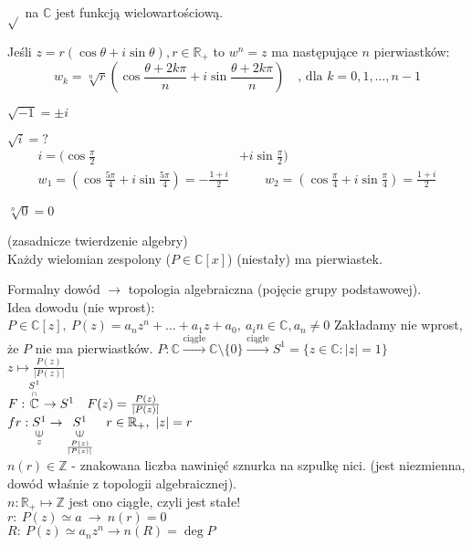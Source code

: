 $\sqrt{}$ na $\mathbb{C}$ jest funkcją wielowartościową.
\begin{ft} 
    Jeśli $ z = r(\cos\theta + i\sin\theta), r \in\mathbb{R}_+$ to $w^n=z$ ma następujące $n$ pierwiastków: 
    \[ w_k = \sqrt[n]{r} (\cos\frac{\theta+2k\pi}{n}+i\sin\frac{\theta+2k\pi}{n}) \quad 
    \text{, dla }k = 0,1,\ldots,n-1 \]
\end{ft}
\begin{prz} $\sqrt{-1} = \pm i$ \end{prz} 
\begin{prz} 
    $\sqrt{i} = ?$ 
    \begin{align*}
        i = (\cos\frac{\pi}{2} &+ i\sin\frac{\pi}{2}) \\
        w_1 = (\cos\frac{5\pi}{4} + i\sin\frac{5\pi}{4})=-\frac{1+i}{2} & \qquad  w_2 = (\cos\frac{\pi}{4} + i\sin\frac{\pi}{4}) = \frac{1+i}{2} 
    \end{align*}
\end{prz}
\begin{uw} $\sqrt[n]{0} = 0 $ \end{uw}
\begin{tw} (zasadnicze twierdzenie algebry) \\ 
    Każdy wielomian zespolony ($P \in \mathbb{C}[x]$) (niestały) ma pierwiastek. 
\end{tw} 
\begin{dd}
    Formalny dowód $\rightarrow$ topologia algebraiczna (pojęcie grupy podstawowej). \\ 
    Idea dowodu (nie wprost): \\ 
    $P \in \mathbb{C}[z],\ P(z) = a_n z^n + \ldots + a_1 z + a_0, \ a_in \in \mathbb{C}, a_n \neq 0$
    Zakładamy nie wprost, że $P$ nie ma pierwiastków. 
    $P: \mathbb{C} \xrightarrow{\text{ciągłe}} \mathbb{C} \setminus \{0\} \xrightarrow{\text{ciągłe}} 
    S^1 = \{z \in \mathbb{C} : |z| = 1\}$ \\ 
    $z \mapsto \frac{P(z)}{|P(z)|}$ \\ 
    $F: \overscript{\mathbb{C}}{\cap}{S^1} \to S^1 \quad F(z) = \frac{P(z)}{|P(z)|}$ \\ 
    $fr: \underscript{S^1}{\vertni}{z} \to \underscript{S^1}{\vertni}{\frac{P(z)}{|P(z)|}} \quad
    r \in \mathbb{R}_+,\ |z| = r$ \\
    $n(r) \in \mathbb{Z}$ - znakowana liczba nawinięć sznurka na szpulkę nici. (jest niezmienna, 
    dowód właśnie z topologii algebraicznej). \\ 
    $n : \mathbb{R}_+ \mapsto \mathbb{Z}$ jest ono ciągłe, czyli jest stałe! \\ 
    $r: \ P(z) \simeq a \ \to \ n(r) = 0$ \\ 
    $R: \ P(z) \simeq a_n z^n \to n(R) = \deg P$ \hfill \lightning
\end{dd} 
